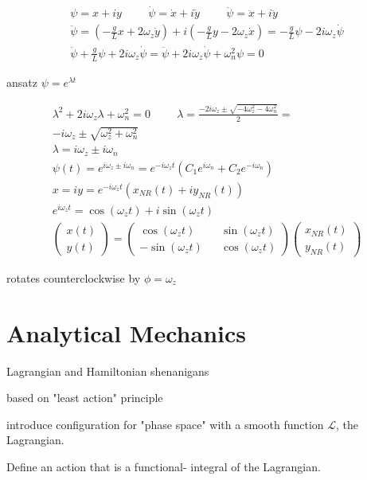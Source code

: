 \documentclass[fleqn]{report}
\newcommand{\hp}{\hspace{1cm}}
\newcommand{\equations} [1] {
\begin{gather*}
#1
\end{gather*}
}
\begin{document}
\equations{
    \psi = x + iy 
    \hp
    \dot \psi = \dot x + i \dot y 
    \hp
    \ddot \psi = \ddot x + i \ddot y 
    \\
    \ddot \psi = 
    \left(
        - \frac{g}{L} x + 2 \omega_z \dot y
    \right)
    + i
    \left( 
        - \frac{g}{L} y - 2 \omega_z \dot x
    \right)
    =
    - \frac{g}{L} \psi - 2 i \omega_z \dot \psi 
    \\
    \ddot \psi + \frac{g}{L} \psi + 2 i \omega_z \dot \psi 
    =
    \ddot \psi + 2 i \omega_z \dot \psi + \omega_n^2 \psi 
    = 0
}
ansatz $\psi = e^{\lambda t}$
%
\equations{
    \lambda^2 + 2 i \omega_z \lambda + \omega_n^2 = 0
    \hp 
    \lambda = 
    \frac{ -2i \omega_z \pm \sqrt{-4 \omega_z^2 - 4 \omega_n^2}}{2}
    =
    \\
    -i \omega_z \pm \sqrt{\omega_z^2 + \omega_n^2}
    \\
    \lambda = i \omega_z \pm i \omega_n
    \\ 
    \psi(t) = e^{i \omega_z \pm i \omega_n}
    =
    e^{-i \omega_z t} (C_1  e^{i \omega_n} + C_2 e^{-i \omega_n})
    \\
    x = iy = e^{-i \omega_z t} (x_{NR}(t) + i y_{NR}(t))
    \\
    e^{i \omega_z t} = \cos(\omega_z t) + i \sin(\omega_z t)
    \\
    \begin{pmatrix}
        x(t) \\ y(t)
    \end{pmatrix}
    =
    \begin{pmatrix}
        \cos(\omega_z t) && \sin(\omega_z t) \\
        - \sin(\omega_z t) && \cos(\omega_z t)
    \end{pmatrix}
    \begin{pmatrix}
        x_{NR}(t) \\ y_{NR}(t)
    \end{pmatrix}
}
rotates counterclockwise by $\phi = \omega_z$

\chapter{Analytical Mechanics}
Lagrangian and Hamiltonian shenanigans 

based on "least action" principle 

introduce configuration for "phase space" with a smooth function $\mathcal L$, 
the Lagrangian.

Define an action that is a functional- integral of the Lagrangian.
\end{document}

